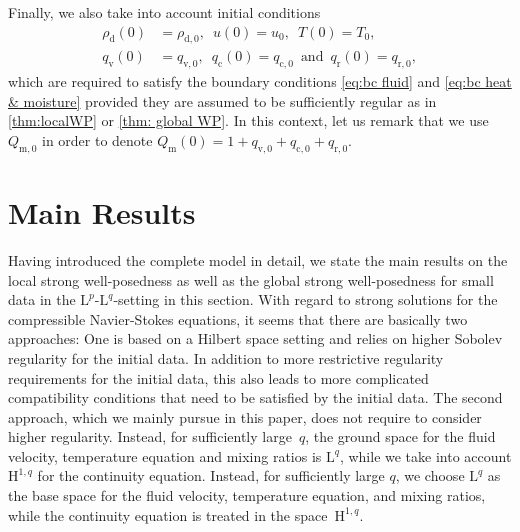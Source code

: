 \documentclass[10pt]{amsart}
\theoremstyle{plain}
\theoremstyle{definition}
\theoremstyle{thm}
\numberwithin{equation}{section}
\newcommand{\rL}{\mathrm{L}}
\newcommand{\rH}{\mathrm{H}}
\newcommand{\tand}{\enspace \text{and} \enspace}
\newcommand{\rd}{\mathrm{d}}
\renewcommand{\rm}{\mathrm{m}}
\newcommand{\rr}{\mathrm{r}}
\newcommand{\rv}{\mathrm{v}}
\newcommand{\rc}{\mathrm{c}}
\begin{document}
Finally, we also take into account initial conditions
\begin{equation}\label{eq:init conds}
    \begin{aligned}
        \rho_\rd(0) 
        &= \rho_{\rd,0}, \enspace u(0) = u_0, \enspace T(0) = T_0,\\
        q_\rv(0) 
        &= q_{\rv,0}, \enspace q_\rc(0) = q_{\rc,0} \tand q_\rr(0) = q_{\rr,0},
    \end{aligned}
\end{equation}
which are required to satisfy the boundary conditions \eqref{eq:bc fluid} and \eqref{eq:bc heat & moisture} provided they are assumed to be sufficiently regular as in \autoref{thm:localWP} or \autoref{thm: global WP}.
In this context, let us remark that we use $Q_{\rm,0}$ in order to denote $Q_\rm(0) = 1 + q_{\rv,0} + q_{\rc,0} + q_{\rr,0}$.



\section{Main Results}\label{sec:main results}

Having introduced the complete model in detail, we state the main results on the local strong well-posedness as well as the global strong well-posedness for small data in the $\rL^p$-$\rL^q$-setting in this section.
With regard to strong solutions for the compressible Navier-Stokes equations, it seems that there are basically two approaches:
One is based on a Hilbert space setting and relies on higher Sobolev regularity for the initial data.
In addition to more restrictive regularity requirements for the initial data, this also leads to more complicated compatibility conditions that need to be satisfied by the initial data.
The second approach, which we mainly pursue in this paper, does not require to consider higher regularity.
Instead, for sufficiently large~$q$, the ground space for the fluid velocity, temperature equation and mixing ratios is $\rL^q$, while we take into account $\rH^{1,q}$ for the continuity equation.
Instead, for sufficiently large $q$, we choose $\rL^q$ as the base space for the fluid velocity, temperature equation, and mixing ratios, while the continuity equation is treated in the space~$\rH^{1,q}$.
\end{document}

